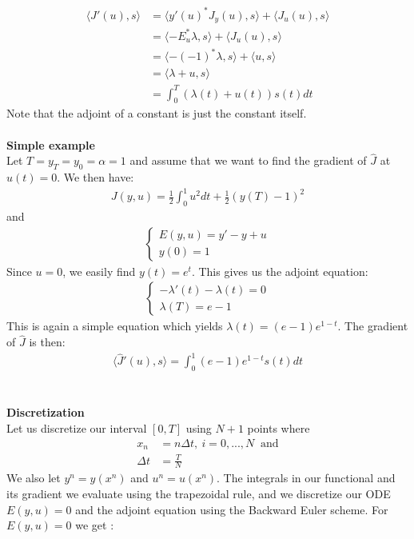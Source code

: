 \documentclass[11pt,a4paper]{report}
\begin{document}
\begin{align*}
\langle\hat{J}'(u),s\rangle&=\langle y'(u)^*J_y(u),s\rangle +\langle J_u(u),s\rangle \\ &=\langle -E_u^*\lambda,s\rangle +\langle J_u(u),s\rangle \\
&=\langle -(-1)^*\lambda,s\rangle +\langle u,s\rangle \\
&=\langle \lambda+u,s\rangle \\
&= \int_0^T(\lambda(t)+u(t))s(t)dt
\end{align*} 
Note that the adjoint of a constant is just the constant itself.
\\
\\
\textbf{Simple example}
\\
Let $T=y_T=y_0=\alpha=1$ and assume that we want to find the gradient of $\hat{J}$ at $u(t)=0$. We then have:
\begin{gather}
J(y,u) = \frac{1}{2}\int_0^1u^2dt + \frac{1}{2}(y(T)-1)^2
\end{gather} 
and
\begin{align}
\left\{
     \begin{array}{lr}
       	E(y,u) = y'- y +u\\
       	   y(0)=1
     \end{array}
   \right.
\end{align}
Since $u=0$, we easily find $y(t)=e^t$. This gives us the adjoint equation:
\begin{align}
   \left\{
     \begin{array}{lr}
       -\lambda'(t) -\lambda(t)=0  \\
       \lambda(T) = e-1
     \end{array}
   \right.
\end{align}
This is again a simple equation which yields $\lambda(t)=(e-1)e^{1-t}$. The gradient of $\hat{J}$ is then:
\begin{align*}
\langle\hat{J}'(u),s\rangle=\int_0^1(e-1)e^{1-t}s(t)dt
\end{align*}
\\
\\
\textbf{Discretization}
\\
Let us discretize our interval $[0,T]$ using $N+1$ points where 
\begin{align*}
x_n &= n\Delta t, \ i=0,...,N \ \text{ and} \\
\Delta t &= \frac{T}{N}
\end{align*}
We also let $y^n = y(x^n)$ and $u^n=u(x^n)$. The integrals in our functional and its gradient we evaluate using the trapezoidal rule, and we discretize our ODE $E(y,u)=0$ and the adjoint equation using the Backward Euler scheme. For $E(y,u)=0$ we get :
\end{document}
